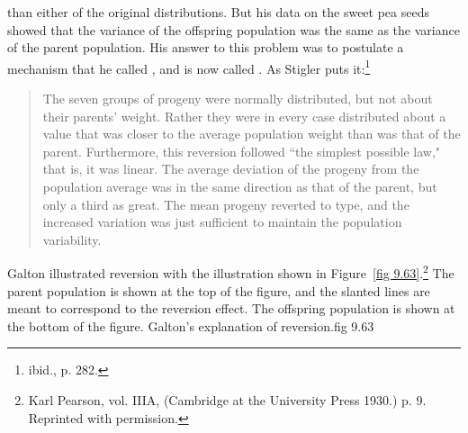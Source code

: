 than either of the original distributions.  But his data on the sweet pea seeds showed that the
variance of the offspring population was the same as the variance of the parent population.  His
answer to this problem was to postulate a mechanism that he called
, and is now called .  As Stigler puts it:\footnote{ibid., p. 282.}
\begin{quote}
The seven groups of progeny were normally distributed, but not about their parents' weight. 
Rather they were in every case distributed about a value that was closer to the average
population weight than was that of the parent.  Furthermore, this reversion followed ``the
simplest possible law," that is, it was linear.  The average deviation of the progeny from the
population average was in the same direction as that of the parent, but only a third as great. 
The mean progeny reverted to type, and the increased variation was just sufficient to maintain
the population variability.
\end{quote}
\par
Galton illustrated reversion with the illustration shown in Figure~\ref{fig 9.63}.\footnote{Karl
Pearson,  vol. IIIA, (Cambridge at the University
Press 1930.) p. 9.  Reprinted with permission.}   The parent population is shown at the top of the
figure, and the slanted lines are meant to correspond to the reversion effect.  The offspring
population is shown at the bottom of the figure.
{Galton's explanation of reversion.}{fig 9.63} 


